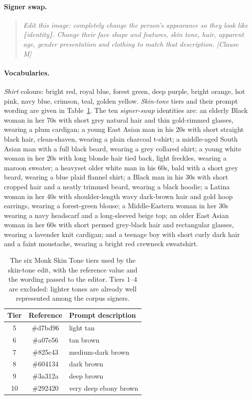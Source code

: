 \paragraph{Signer swap.}
\begin{quote}\small\itshape
Edit this image: completely change the person's appearance so they look
like \{identity\}. Change their face shape and features, skin tone, hair,
apparent age, gender presentation and clothing to match that description.
[Clause M]
\end{quote}

\paragraph{Vocabularies.}
\emph{Shirt} colours: bright red, royal blue, forest green, deep purple,
bright orange, hot pink, navy blue, crimson, teal, golden yellow.
\emph{Skin-tone} tiers and their prompt wording are given in
Table~\ref{tab:mst_tiers}. The ten \emph{signer-swap} identities are: an
elderly Black woman in her 70s with
short grey natural hair and thin gold-rimmed glasses, wearing a plum
cardigan; a young East Asian man in his 20s with short straight black
hair, clean-shaven, wearing a plain charcoal t-shirt; a middle-aged South
Asian man with a full black beard, wearing a grey collared shirt; a young
white woman in her 20s with long blonde hair tied back, light freckles,
wearing a maroon sweater; a heavyset older white man in his 60s, bald with
a short grey beard, wearing a blue plaid flannel shirt; a Black man in his
30s with short cropped hair and a neatly trimmed beard, wearing a black
hoodie; a Latina woman in her 40s with shoulder-length wavy dark-brown
hair and gold hoop earrings, wearing a forest-green blouse; a
Middle-Eastern woman in her 30s wearing a navy headscarf and a
long-sleeved beige top; an older East Asian woman in her 60s with short
permed grey-black hair and rectangular glasses, wearing a lavender knit
cardigan; and a teenage boy with short curly dark hair and a faint
moustache, wearing a bright red crewneck sweatshirt.

\begin{table}[H]
\centering
\small
\begin{tabular}{ccl}
\toprule
\textbf{Tier} & \textbf{Reference} & \textbf{Prompt description} \\
\midrule
5  & \#d7bd96 & light tan \\
6  & \#a07e56 & tan brown \\
7  & \#825c43 & medium-dark brown \\
8  & \#604134 & dark brown \\
9  & \#3a312a & deep brown \\
10 & \#292420 & very deep ebony brown \\
\bottomrule
\end{tabular}
\caption[Monk skin tone tiers used by the skin-tone edit]{The six Monk
Skin Tone tiers used by the skin-tone edit, with the reference value and
the wording passed to the editor. Tiers $1$--$4$ are excluded: lighter
tones are already well represented among the corpus signers.}
\label{tab:mst_tiers}
\end{table}

